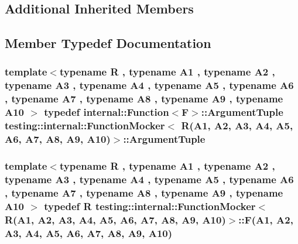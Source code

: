 \subsection*{Additional Inherited Members}


\subsection{Member Typedef Documentation}
\subsubsection[{\texorpdfstring{Argument\+Tuple}{ArgumentTuple}}]{\setlength{\rightskip}{0pt plus 5cm}template$<$typename R , typename A1 , typename A2 , typename A3 , typename A4 , typename A5 , typename A6 , typename A7 , typename A8 , typename A9 , typename A10 $>$ typedef {\bf internal\+::\+Function}$<${\bf F}$>$\+::{\bf Argument\+Tuple} {\bf testing\+::internal\+::\+Function\+Mocker}$<$ R(A1, A2, A3, A4, A5, A6, A7, A8, A9, A10)$>$\+::{\bf Argument\+Tuple}}\hypertarget{classtesting_1_1internal_1_1FunctionMocker_3_01R_07A1_00_01A2_00_01A3_00_01A4_00_01A5_00_01A6_0079295c90ba14a714e84d5a856a5b50dd_ac485428e5208eda1dbc15df996f9f81d}{}\label{classtesting_1_1internal_1_1FunctionMocker_3_01R_07A1_00_01A2_00_01A3_00_01A4_00_01A5_00_01A6_0079295c90ba14a714e84d5a856a5b50dd_ac485428e5208eda1dbc15df996f9f81d}
\subsubsection[{\texorpdfstring{F}{F}}]{\setlength{\rightskip}{0pt plus 5cm}template$<$typename R , typename A1 , typename A2 , typename A3 , typename A4 , typename A5 , typename A6 , typename A7 , typename A8 , typename A9 , typename A10 $>$ typedef R {\bf testing\+::internal\+::\+Function\+Mocker}$<$ R(A1, A2, A3, A4, A5, A6, A7, A8, A9, A10)$>$\+::F(A1, A2, A3, A4, A5, A6, A7, A8, A9, A10)}\hypertarget{classtesting_1_1internal_1_1FunctionMocker_3_01R_07A1_00_01A2_00_01A3_00_01A4_00_01A5_00_01A6_0079295c90ba14a714e84d5a856a5b50dd_a2d90d01f106c17651d836bc1c00789f6}{}\label{classtesting_1_1internal_1_1FunctionMocker_3_01R_07A1_00_01A2_00_01A3_00_01A4_00_01A5_00_01A6_0079295c90ba14a714e84d5a856a5b50dd_a2d90d01f106c17651d836bc1c00789f6}


